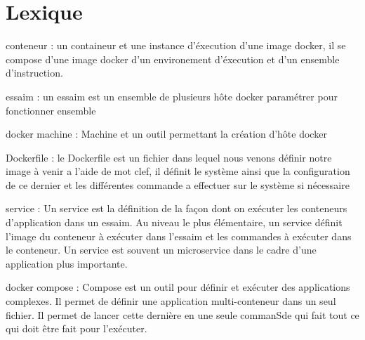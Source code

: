 \chapter{Lexique}

\par conteneur : un containeur et une instance d’éxecution d’une image docker, il se compose d’une image docker d’un environement d’éxecution et d’un ensemble d’instruction.

\par essaim : un essaim est un ensemble de plusieurs hôte docker paramétrer pour fonctionner ensemble 

\par docker machine : Machine et un outil permettant la création d’hôte docker 

\par Dockerfile : le Dockerfile est un fichier dans lequel nous venons définir notre image à venir  a l’aide de mot clef, il définit le système ainsi que la configuration de ce dernier et les différentes commande a effectuer sur le système si nécessaire 

\par service : Un service est la définition de la façon dont on exécuter les conteneurs d'application dans un essaim. Au niveau le plus élémentaire, un service définit l'image du conteneur à exécuter dans l'essaim et les commandes à exécuter dans le conteneur. Un service est souvent un microservice dans le cadre d'une application plus importante.

\par docker compose : Compose est un outil pour définir et exécuter des applications complexes. Il permet de définir  une application multi-conteneur dans un seul fichier. Il permet de lancer cette dernière en une seule commanSde qui fait tout ce qui doit être fait pour l'exécuter.